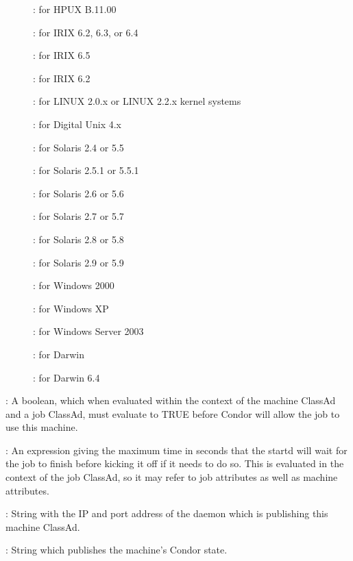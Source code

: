 \begin{description}
\begin{description}
	\item[] : for HPUX B.11.00
	\item[] : for IRIX 6.2, 6.3, or 6.4
	\item[] : for IRIX 6.5
	\item[] : for IRIX 6.2
	\item[] : for LINUX 2.0.x or LINUX 2.2.x kernel systems
	\item[] : for Digital Unix 4.x
	\item[] : for Solaris 2.4 or 5.5
	\item[] : for Solaris 2.5.1 or 5.5.1
	\item[] : for Solaris 2.6 or 5.6
	\item[] : for Solaris 2.7 or 5.7
	\item[] : for Solaris 2.8 or 5.8
	\item[] : for Solaris 2.9 or 5.9
	\item[] : for Windows 2000
	\item[] : for Windows XP
	\item[] : for Windows Server 2003
	\item[] : for Darwin
	\item[] : for Darwin 6.4
	\end{description}
%
\item[\AdAttr{Requirements}] : A boolean, which when evaluated within the context
of the machine ClassAd and a job ClassAd, must evaluate to
TRUE before Condor will allow the job to use this machine.
%
\item[\AdAttr{MaxJobRetirementTime}] : An expression giving the
maximum time in seconds that the startd will wait for the job to
finish before kicking it off if it needs to do so.  This is evaluated
in the context of the job ClassAd, so it may refer to job attributes
as well as machine attributes.
%
\item[\AdAttr{StartdIpAddr}] : String with the IP and port address of the
 daemon which is publishing this machine ClassAd.
%
\item[\AdAttr{State}] : String which publishes the machine's Condor state.

\end{description}
